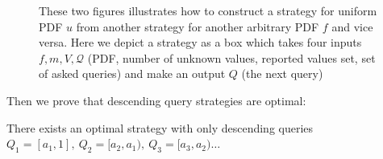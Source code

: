 \begin{figure}
\centering
  \caption{These two figures illustrates how to construct a strategy for
  uniform PDF $u$ from another strategy for another arbitrary PDF $f$ and vice
  versa. Here we depict a strategy as a box which takes four inputs $f, m, V,
  \mathcal Q$ (PDF, number of unknown values, reported values set, set of asked
  queries) and make an output $Q$ (the next query)} \label{fig:uniform}
\end{figure}

Then we prove that descending query strategies are optimal:
\begin{lemma}\label{lemma:descending}

There exists an optimal strategy with only descending queries
$Q_1 = [a_1, 1], ~Q_2 = [a_2, a_1), ~Q_3 = [a_3, a_2)\ldots$

\end{lemma}

